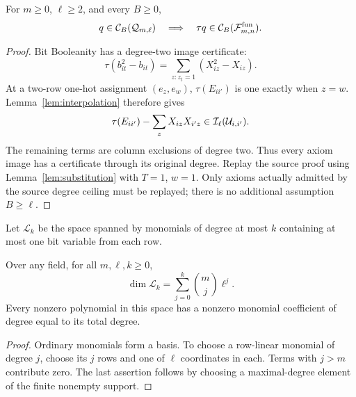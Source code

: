 \begin{lemma}\label{lem:decoder}
For \(m\ge0\), \(\ell\ge2\), and every \(B\ge0\),
\[
 q\in\mathcal C_B(\mathcal Q_{m,\ell})
 \quad\Longrightarrow\quad
 \tau q\in\mathcal C_B(\mathcal F^{\mathrm{fun}}_{m,n}).
\]
\end{lemma}
\begin{proof}
Bit Booleanity has a degree-two image certificate:
\[
 \tau(b_{it}^2-b_{it})=\sum_{z:z_t=1}(X_{iz}^2-X_{iz}).
\]
At a two-row one-hot assignment \((e_z,e_w)\), \(\tau(E_{ii'})\)
is one exactly when \(z=w\). Lemma~\ref{lem:interpolation} therefore gives
\[
 \tau(E_{ii'})-\sum_zX_{iz}X_{i'z}
       \in\mathcal I_\ell(\mathcal U_{i,i'}).
\]
The remaining terms are column exclusions of degree two. Thus every axiom
image has a certificate through its original degree. Replay the source
proof using Lemma~\ref{lem:substitution} with \(T=1\), \(w=1\).
Only axioms actually admitted by the source degree ceiling must be replayed;
there is no additional assumption \(B\ge\ell\).
\end{proof}


Let \(\mathcal L_k\) be the space spanned by monomials of degree at most
\(k\) containing at most one bit variable from each row.

\begin{lemma}\label{lem:row-dimension}
Over any field, for all \(m,\ell,k\ge0\),
\begin{equation}\label{eq:row-linear-dimension}
 \dim\mathcal L_k=\sum_{j=0}^k\binom mj\ell^j.
\end{equation}
Every nonzero polynomial in this space has a nonzero monomial coefficient
of degree equal to its total degree.
\end{lemma}
\begin{proof}
Ordinary monomials form a basis. To choose a row-linear monomial of degree
\(j\), choose its \(j\) rows and one of \(\ell\) coordinates in each.
Terms with \(j>m\) contribute zero. The last assertion follows by choosing
a maximal-degree element of the finite nonempty support.
\end{proof}

